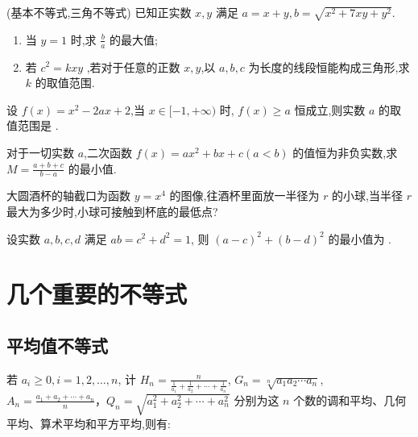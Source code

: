 \documentclass[a4paper , final]{ctexart}
\newenvironment{problem}[1]{%
  \item #1
  \par
  \vspace{8cm}
}{}
\begin{document}
\begin{problems}
  \begin{problem}
  {(基本不等式,三角不等式)
  已知正实数 $x,y$ 满足 $a=x+y,b=\sqrt{x^2+7xy+y^2}$.
  \begin{enumerate}[label=(\arabic*)]
    \item 当 $y=1$ 时,求 $\frac{b}{a}$ 的最大值;
    \item 若 $c^2=kxy$ ,若对于任意的正数 $x,y$,以 $a,b,c$ 为长度的线段恒能构成三角形,求 $k$ 的取值范围.
  \end{enumerate}
  }
  \end{problem}

  \begin{problem}
  {
  设 $f(x)=x^2-2ax+2$,当 $x\in[-1,+\infty)$ 时, $f(x)\geq a$ 恒成立,则实数 $a$ 的取值范围是 \underline{\hspace{3cm}}.
  }
  \end{problem}

  \begin{problem}
  {
  对于一切实数 $a$,二次函数 $f(x)=ax^2+bx+c(a<b)$ 的值恒为非负实数,求 $M=\frac{a+b+c}{b-a}$ 的最小值.
  }
  \end{problem}

  \begin{problem}
  {
  大圆酒杯的轴截口为函数 $y=x^4$ 的图像,往酒杯里面放一半径为 $r$ 的小球,当半径 $r$ 最大为多少时,小球可接触到杯底的最低点?
  }
  \end{problem}

  \begin{problem}
  {
  设实数 $a,b,c,d$ 满足 $ab=c^2+d^2=1$, 则 $(a-c)^2+(b-d)^2$ 的最小值为 \underline{\hspace{3cm}}.
  }
  \end{problem}
\end{problems}

\section*{几个重要的不等式}

\subsection*{平均值不等式}


若 $a_i \ge 0,i=1,2,\ldots,n$, 计 $H_n =\frac{n}{\frac{1}{a_1}+\frac{1}{a_2}+\cdots+\frac{1}{a_n}}$, $G_n = \sqrt[n]{a_1 a_2 \cdots a_n}$, $A_n = \frac{a_1+a_2+\cdots+a_n}{n}$，$Q_n = \sqrt{a_1^2+a_2^2+\cdots+a_n^2}$ 分别为这 $n$ 个数的调和平均、几何平均、算术平均和平方平均,则有:
\end{document}
